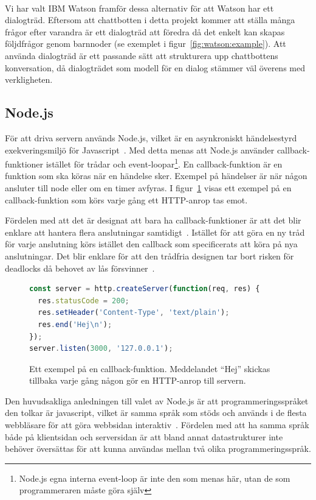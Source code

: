 \documentclass[a4paper,12pt]{article}
\newcommand{\emptyparagraph}{\paragraph{}\hspace{-1em}}
\begin{document}
\emptyparagraph Vi har valt IBM Watson framför dessa alternativ för att Watson har ett dialogträd. Eftersom att chattbotten i detta projekt kommer att ställa många frågor efter varandra är ett dialogträd att föredra då det enkelt kan skapas följdfrågor genom barnnoder (se exemplet i figur~\ref{fig:watson:example}). Att använda dialogträd är ett passande sätt att strukturera upp chattbottens konversation, då dialogträdet som modell för en dialog stämmer väl överens med verkligheten.

\subsection{Node.js}
\label{sec:nodejs}
\FloatBarrier
För att driva servern används Node.js, vilket är en asynkroniskt händelsestyrd exekveringsmiljö för Javascript~\cite{web:nodejs}. Med detta menas att Node.js använder callback-\-funktioner istället för trådar och event-loopar\footnote{Node.js egna interna event-loop är inte den som menas här, utan de som programmeraren måste göra själv}. En callback-funktion är en funktion som ska köras när en händelse sker. Exempel på händelser är när någon ansluter till node eller om en timer avfyras. I figur~\ref{fig:node:callback} visas ett exempel på en callback-funktion som körs varje gång ett HTTP-anrop tas emot.

Fördelen med att det är designat att bara ha callback-funktioner är att det blir enklare att hantera flera anslutningar samtidigt~\cite{web:nodejs}. Istället för att göra en ny tråd för varje anslutning körs istället den callback som specificerats att köra på nya anslutningar. Det blir enklare för att den trådfria designen tar bort risken för deadlocks då behovet av lås försvinner~\cite{web:nodejs, web:wikipedia:deadlock}. 

\begin{figure}[htbp]
    \centering
    \begin{lstlisting}[language=jsx]
const server = http.createServer(function(req, res) {
  res.statusCode = 200;
  res.setHeader('Content-Type', 'text/plain');
  res.end('Hej\n');
});
server.listen(3000, '127.0.0.1');
    \end{lstlisting}
    \caption{Ett exempel på en callback-funktion. Meddelandet ``Hej'' skickas tillbaka varje gång någon gör en HTTP-anrop till servern.}
    \label{fig:node:callback}
\end{figure}

Den huvudsakliga anledningen till valet av Node.js är att programmeringsspråket den tolkar är javascript, vilket är samma språk som stöds och används i de flesta webbläsare för att göra webbsidan interaktiv~\cite{web:mozilla:whatisjs}. Fördelen med att ha samma språk både på klientsidan och serversidan är att bland annat datastrukturer inte behöver översättas för att kunna användas mellan två olika programmeringsspråk.
\end{document}
